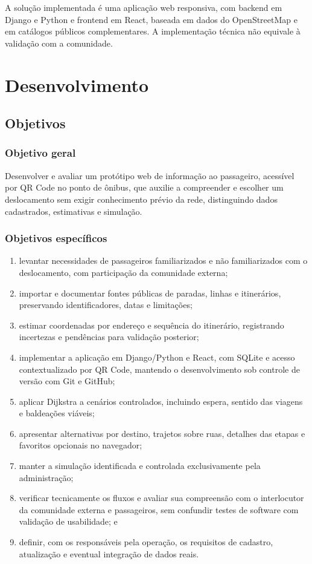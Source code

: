 \documentclass[12pt,oneside,a4paper,brazil]{abntex2}
\begin{document}
A solução implementada é uma aplicação web responsiva, com backend em Django e Python e frontend em React, baseada em dados do OpenStreetMap e em catálogos públicos complementares. A implementação técnica não equivale à validação com a comunidade.

\chapter{Desenvolvimento}
\section{Objetivos}
\subsection{Objetivo geral}
Desenvolver e avaliar um protótipo web de informação ao passageiro, acessível por QR Code no ponto de ônibus, que auxilie a compreender e escolher um deslocamento sem exigir conhecimento prévio da rede, distinguindo dados cadastrados, estimativas e simulação.

\subsection{Objetivos específicos}
\begin{enumerate}[label=\alph*)]
\item levantar necessidades de passageiros familiarizados e não familiarizados com o deslocamento, com participação da comunidade externa;
\item importar e documentar fontes públicas de paradas, linhas e itinerários, preservando identificadores, datas e limitações;
\item estimar coordenadas por endereço e sequência do itinerário, registrando incertezas e pendências para validação posterior;
\item implementar a aplicação em Django/Python e React, com SQLite e acesso contextualizado por QR Code, mantendo o desenvolvimento sob controle de versão com Git e GitHub;
\item aplicar Dijkstra a cenários controlados, incluindo espera, sentido das viagens e baldeações viáveis;
\item apresentar alternativas por destino, trajetos sobre ruas, detalhes das etapas e favoritos opcionais no navegador;
\item manter a simulação identificada e controlada exclusivamente pela administração;
\item verificar tecnicamente os fluxos e avaliar sua compreensão com o interlocutor da comunidade externa e passageiros, sem confundir testes de software com validação de usabilidade; e
\item definir, com os responsáveis pela operação, os requisitos de cadastro, atualização e eventual integração de dados reais.
\end{enumerate}
\end{document}
